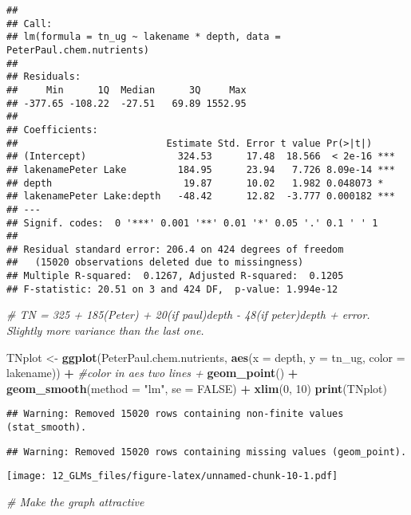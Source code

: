 \documentclass[]{article}
\newenvironment{Shaded}{\begin{snugshade}}{\end{snugshade}}
\newcommand{\KeywordTok}[1]{\textcolor[rgb]{0.13,0.29,0.53}{\textbf{#1}}}
\newcommand{\DataTypeTok}[1]{\textcolor[rgb]{0.13,0.29,0.53}{#1}}
\newcommand{\DecValTok}[1]{\textcolor[rgb]{0.00,0.00,0.81}{#1}}
\newcommand{\StringTok}[1]{\textcolor[rgb]{0.31,0.60,0.02}{#1}}
\newcommand{\CommentTok}[1]{\textcolor[rgb]{0.56,0.35,0.01}{\textit{#1}}}
\newcommand{\OtherTok}[1]{\textcolor[rgb]{0.56,0.35,0.01}{#1}}
\newcommand{\OperatorTok}[1]{\textcolor[rgb]{0.81,0.36,0.00}{\textbf{#1}}}
\newcommand{\NormalTok}[1]{#1}
\begin{document}
\begin{verbatim}
## 
## Call:
## lm(formula = tn_ug ~ lakename * depth, data = PeterPaul.chem.nutrients)
## 
## Residuals:
##     Min      1Q  Median      3Q     Max 
## -377.65 -108.22  -27.51   69.89 1552.95 
## 
## Coefficients:
##                          Estimate Std. Error t value Pr(>|t|)    
## (Intercept)                324.53      17.48  18.566  < 2e-16 ***
## lakenamePeter Lake         184.95      23.94   7.726 8.09e-14 ***
## depth                       19.87      10.02   1.982 0.048073 *  
## lakenamePeter Lake:depth   -48.42      12.82  -3.777 0.000182 ***
## ---
## Signif. codes:  0 '***' 0.001 '**' 0.01 '*' 0.05 '.' 0.1 ' ' 1
## 
## Residual standard error: 206.4 on 424 degrees of freedom
##   (15020 observations deleted due to missingness)
## Multiple R-squared:  0.1267, Adjusted R-squared:  0.1205 
## F-statistic: 20.51 on 3 and 424 DF,  p-value: 1.994e-12
\end{verbatim}

\begin{Shaded}
\begin{Highlighting}[]
\CommentTok{# TN = 325 + 185(Peter) + 20(if paul)depth - 48(if peter)depth + error. Slightly more variance than the last one.}

\NormalTok{TNplot <-}\StringTok{ }\KeywordTok{ggplot}\NormalTok{(PeterPaul.chem.nutrients, }\KeywordTok{aes}\NormalTok{(}\DataTypeTok{x =}\NormalTok{ depth, }\DataTypeTok{y =}\NormalTok{ tn_ug, }\DataTypeTok{color =}\NormalTok{ lakename)) }\OperatorTok{+}\StringTok{ }
\StringTok{  }\CommentTok{#color in aes two lines + }
\StringTok{  }\KeywordTok{geom_point}\NormalTok{() }\OperatorTok{+}\StringTok{ }
\StringTok{  }\KeywordTok{geom_smooth}\NormalTok{(}\DataTypeTok{method =} \StringTok{"lm"}\NormalTok{, }\DataTypeTok{se =} \OtherTok{FALSE}\NormalTok{) }\OperatorTok{+}
\StringTok{  }\KeywordTok{xlim}\NormalTok{(}\DecValTok{0}\NormalTok{, }\DecValTok{10}\NormalTok{)}
\KeywordTok{print}\NormalTok{(TNplot)}
\end{Highlighting}
\end{Shaded}

\begin{verbatim}
## Warning: Removed 15020 rows containing non-finite values (stat_smooth).
\end{verbatim}

\begin{verbatim}
## Warning: Removed 15020 rows containing missing values (geom_point).
\end{verbatim}

\texttt{[image: 12\_GLMs\_files/figure-latex/unnamed-chunk-10-1.pdf]}

\begin{Shaded}
\begin{Highlighting}[]
\CommentTok{# Make the graph attractive}
\end{Highlighting}
\end{Shaded}
\end{document}
